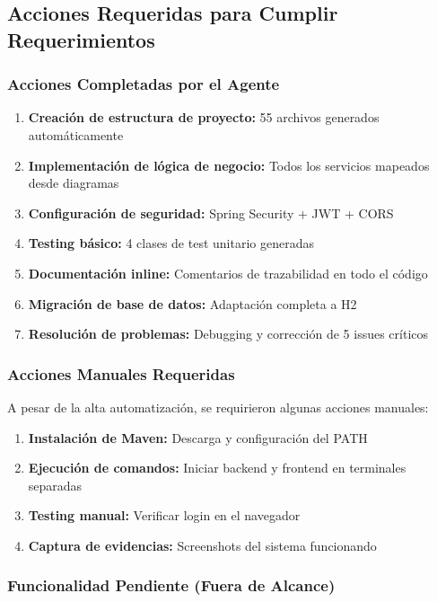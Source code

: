 \documentclass[11pt,a4paper]{article}
\begin{document}
\subsection{Acciones Requeridas para Cumplir Requerimientos}

\subsubsection{Acciones Completadas por el Agente}

\begin{enumerate}
    \item \textbf{Creación de estructura de proyecto:} 55 archivos generados automáticamente
    \item \textbf{Implementación de lógica de negocio:} Todos los servicios mapeados desde diagramas
    \item \textbf{Configuración de seguridad:} Spring Security + JWT + CORS
    \item \textbf{Testing básico:} 4 clases de test unitario generadas
    \item \textbf{Documentación inline:} Comentarios de trazabilidad en todo el código
    \item \textbf{Migración de base de datos:} Adaptación completa a H2
    \item \textbf{Resolución de problemas:} Debugging y corrección de 5 issues críticos
\end{enumerate}

\subsubsection{Acciones Manuales Requeridas}

A pesar de la alta automatización, se requirieron algunas acciones manuales:

\begin{enumerate}
    \item \textbf{Instalación de Maven:} Descarga y configuración del PATH
    \item \textbf{Ejecución de comandos:} Iniciar backend y frontend en terminales separadas
    \item \textbf{Testing manual:} Verificar login en el navegador
    \item \textbf{Captura de evidencias:} Screenshots del sistema funcionando
\end{enumerate}

\subsubsection{Funcionalidad Pendiente (Fuera de Alcance)}
\end{document}
